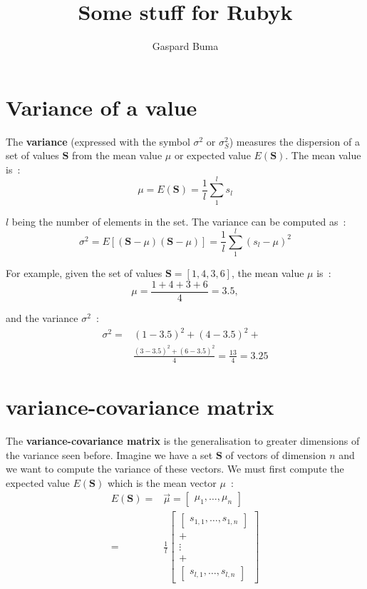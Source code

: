 \documentclass[11pt,twocolumn]{amsart} %
\title{Some stuff for Rubyk}
\author{Gaspard Buma}
\begin{document}
\twocolumn[
\maketitle
]
\section{Variance of a value}

The \textbf{variance} (expressed with the symbol $\sigma^2$ or $\sigma_S^2$) measures the dispersion of a set of values $\textbf{S}$ from the mean value $\mu$ or expected value $E(\textbf{S})$. The mean value is~:
\begin{equation*}
  \mu = E(\textbf{S}) = \frac{1}{l} \sum_1^{l} s_l
\end{equation*}

$l$ being the number of elements in the set. The variance can be computed as~:
\[
  \sigma^2 = E[(\textbf{S} - \mu)(\textbf{S} - \mu)] = \frac{1}{l} \sum_1^{l} (s_l - \mu)^2
\]

For example, given the set of values $\textbf{S} = [1,4,3,6]$, the mean value $\mu$ is~:
\[
  \mu = \frac{1+4+3+6}{4} = 3.5,
\]

and the variance $\sigma^2$~:
\begin{align*}
  \sigma^2 = & (1-3.5)^2 + (4-3.5)^2 +\\
             & \frac{(3-3.5)^2 + (6-3.5)^2}{4} = \frac{13}{4} = 3.25
\end{align*}

\section{variance-covariance matrix}

The \textbf{variance-covariance matrix} is the generalisation to greater dimensions of the variance seen before. Imagine we have a set $\textbf{S}$ of vectors of dimension $n$ and we want to compute the variance of these vectors. We must first compute the expected value $E(\textbf{S})$ which is the mean vector $\mu$~:
\begin{align*}
  E(\textbf{S}) = & \vec{\mu} = \begin{bmatrix} \mu_1, \hdots, \mu_n \end{bmatrix} \\
       = & \frac{1}{l} \begin{bmatrix} \begin{bmatrix} s_{1,1}, \hdots, s_{1,n} \end{bmatrix} \\ + \\ \vdots \\ + \\ \begin{bmatrix} s_{l,1}, \hdots, s_{l,n} \end{bmatrix} \end{bmatrix}
\end{align*}
\end{document}
